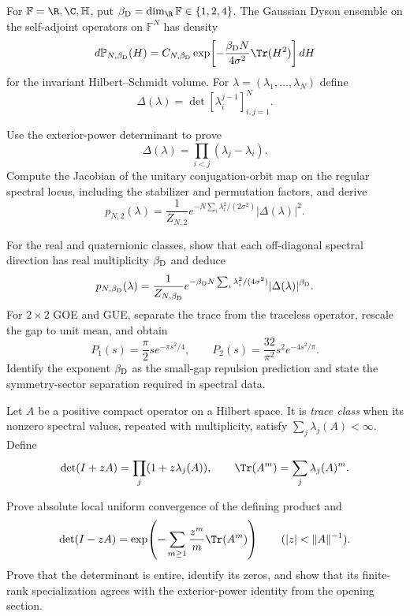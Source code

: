 \begin{exercise}
For $\mathbb F=\R,\C,\mathbb H$, put
$\beta_{\rm D}=\dim_\R\mathbb F\in\{1,2,4\}$.  The Gaussian Dyson ensemble on the
self-adjoint operators on $\mathbb F^N$ has density
\[
d\mathbb P_{N,\beta_{\rm D}}(H)
=C_{N,\beta_{\rm D}}\exp\!\left[-\frac{\beta_{\rm D}N}{4\sigma^2}
\Tr(H^2)\right]dH
\]
for the invariant Hilbert--Schmidt volume.  For
$\lambda=(\lambda_1,\ldots,\lambda_N)$ define
\[
\Delta(\lambda)=\det[\lambda_i^{j-1}]_{i,j=1}^N.
\]

Use the exterior-power determinant to prove
\[
\Delta(\lambda)=\prod_{i<j}(\lambda_j-\lambda_i).
\]
Compute the Jacobian of the unitary conjugation-orbit map on the regular
spectral locus, including the stabilizer and permutation factors, and derive
\[
p_{N,2}(\lambda)
=\frac1{Z_{N,2}}
e^{-N\sum_i\lambda_i^2/(2\sigma^2)}
|\Delta(\lambda)|^2.
\]
\end{exercise}

\begin{exercise}
For the real and quaternionic classes, show that each off-diagonal spectral
direction has real multiplicity $\beta_{\rm D}$ and deduce
\[
p_{N,\beta_{\rm D}}(\lambda)
=\frac1{Z_{N,\beta_{\rm D}}}
e^{-\beta_{\rm D}N\sum_i\lambda_i^2/(4\sigma^2)}
|\Delta(\lambda)|^{\beta_{\rm D}}.
\]
For $2\times2$ GOE and GUE, separate the trace from the traceless operator,
rescale the gap to unit mean, and obtain
\[
P_1(s)=\frac\pi2s e^{-\pi s^2/4},
\qquad
P_2(s)=\frac{32}{\pi^2}s^2e^{-4s^2/\pi}.
\]
Identify the exponent $\beta_{\rm D}$ as the small-gap repulsion prediction and
state the symmetry-sector separation required in spectral data.
\end{exercise}

\begin{exercise}
Let $A$ be a positive compact operator on a Hilbert space.  It is
\emph{trace class} when its nonzero spectral values, repeated with
multiplicity, satisfy $\sum_j\lambda_j(A)<\infty$.  Define
\[
\det(I+zA)=\prod_j(1+z\lambda_j(A)),
\qquad
\Tr(A^m)=\sum_j\lambda_j(A)^m.
\]

Prove absolute local uniform convergence of the defining product and
\[
\det(I-zA)
=\exp\!\left(-\sum_{m\geq1}\frac{z^m}{m}\Tr(A^m)\right)
\qquad(|z|<\|A\|^{-1}).
\]
Prove that the determinant is entire, identify its zeros, and show that its
finite-rank specialization agrees with the exterior-power identity from the
opening section.
\end{exercise}

